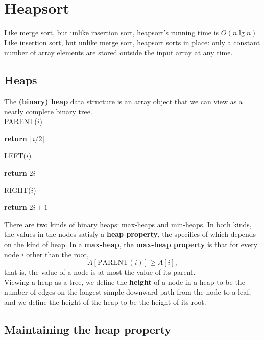 \documentclass[12pt]{article}
\begin{document}
\section{Heapsort}

Like merge sort, but unlike insertion sort, heapsort's running time is $O(n \lg n)$. Like insertion sort, but unlike merge sort, heapsort sorts in place: only a constant number of array elements are stored outside the input array at any time.

\subsection{Heaps}

The \textbf {(binary) heap} data structure is an array object that we can view as a nearly complete binary tree. \\

PARENT($i$)
\begin{algorithmic}[1]
\State \textbf {return} $\lfloor i/2 \rfloor$
\end{algorithmic}

LEFT($i$)
\begin{algorithmic}[1]
\State \textbf {return} $2i$
\end{algorithmic}

RIGHT($i$)
\begin{algorithmic}[1]
\State \textbf {return} $2i+1$
\end{algorithmic}

There are two kinds of binary heaps: max-heaps and min-heaps. In both kinds, the values in the nodes satisfy a {\bf heap property}, the specifics of which depends on the kind of heap. In a {\bf max-heap}, the {\bf max-heap property} is that for every node $i$ other than the root,
\begin{equation*}
  A[\text{PARENT}(i)] \ge A[i],
\end{equation*}
that is, the value of a node is at most the value of its parent. \\

Viewing a heap as a tree, we define the {\bf height} of a node in a heap to be the number of edges on the longest simple downward path from the node to a leaf, and we define the height of the heap to be the height of its root.

\subsection{Maintaining the heap property}
\end{document}
